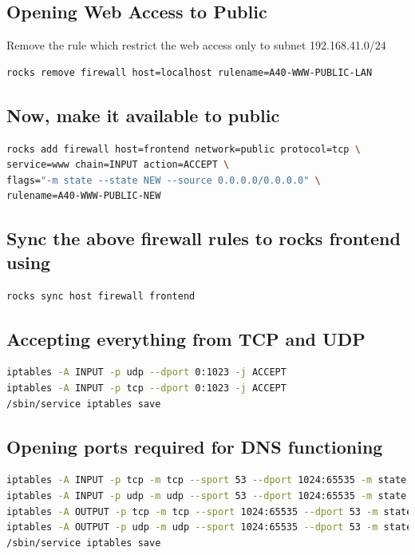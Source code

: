 \subsection{Opening Web Access to Public}
Remove the rule which restrict the web access only to subnet 192.168.41.0/24
\begin{lstlisting}[language=bash]
rocks remove firewall host=localhost rulename=A40-WWW-PUBLIC-LAN
\end{lstlisting}

\subsection{Now, make it available to public}
\begin{lstlisting}[language=bash]
rocks add firewall host=frontend network=public protocol=tcp \
service=www chain=INPUT action=ACCEPT \
flags="-m state --state NEW --source 0.0.0.0/0.0.0.0" \
rulename=A40-WWW-PUBLIC-NEW
\end{lstlisting}
\subsection{Sync the above firewall rules to rocks frontend using }
\begin{lstlisting}[language=bash]
rocks sync host firewall frontend
\end{lstlisting}
\subsection{Accepting everything from TCP and UDP }
\begin{lstlisting}[language=bash]
iptables -A INPUT -p udp --dport 0:1023 -j ACCEPT
iptables -A INPUT -p tcp --dport 0:1023 -j ACCEPT
/sbin/service iptables save
\end{lstlisting}
\subsection{Opening ports required for DNS functioning}

\begin{lstlisting}[language=bash]
iptables -A INPUT -p tcp -m tcp --sport 53 --dport 1024:65535 -m state \ --state ESTABLISHED -j ACCEPT
iptables -A INPUT -p udp -m udp --sport 53 --dport 1024:65535 -m state \ --state ESTABLISHED -j ACCEPT
iptables -A OUTPUT -p tcp -m tcp --sport 1024:65535 --dport 53 -m state \ --state NEW,ESTABLISHED -j ACCEPT
iptables -A OUTPUT -p udp -m udp --sport 1024:65535 --dport 53 -m state \ --state NEW,ESTABLISHED -j ACCEPT
/sbin/service iptables save

\end{lstlisting}
